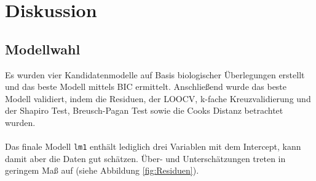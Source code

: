 \section{Diskussion}

\subsection{Modellwahl}

Es wurden vier Kandidatenmodelle auf Basis biologischer Überlegungen erstellt und das beste Modell mittels BIC
ermittelt. Anschließend wurde das beste Modell validiert, indem die Residuen, der LOOCV, k-fache Kreuzvalidierung
und der Shapiro Test, Breusch-Pagan Test sowie die Cooks Distanz betrachtet wurden.
\\
\\
Das finale Modell \texttt{lm1} enthält lediglich drei Variablen mit dem Intercept, kann damit aber die Daten
gut schätzen. Über- und Unterschätzungen treten in geringem Maß auf (siehe Abbildung \ref{fig:Residuen}).

